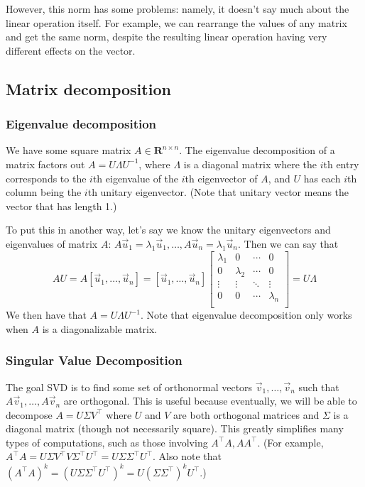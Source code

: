 \documentclass[answers,12pt]{exam}
\begin{document}
However, this norm has some problems: namely, it doesn't say much about the linear operation itself.
For example, we can rearrange the values of any matrix and get the same norm, despite the resulting linear operation having very different effects on the vector.


\subsection{Matrix decomposition}

\subsubsection{Eigenvalue decomposition}
We have some square matrix $A \in \mathbf{R}^{n \times n}$.
The eigenvalue decomposition of a matrix factors out $A = U \Lambda U^{-1}$, where $\Lambda$ is a diagonal matrix where the $i$th entry corresponds to the $i$th eigenvalue of the $i$th eigenvector of $A$, and $U$ has each $i$th column being the $i$th unitary eigenvector.
(Note that unitary vector means the vector that has length 1.)

To put this in another way, let's say we know the unitary eigenvectors and eigenvalues of matrix $A$: $A \vec{u}_1 = \lambda_1 \vec{u}_1, \dots, A \vec{u}_n = \lambda_1 \vec{u}_n$.
Then we can say that 
\[
    AU = A [\vec{u}_1, \dots, \vec{u}_n] = [\vec{u}_1, \dots, \vec{u}_n]
    \begin{bmatrix}
        \lambda_1 & 0 & \cdots & 0 \\
        0 & \lambda_2 & \cdots & 0 \\
        \vdots & \vdots & \ddots & \vdots \\
        0 & 0 & \cdots & \lambda_n \\
    \end{bmatrix}
    = U \Lambda
\]
We then have that $A = U \Lambda U^{-1}$.
Note that eigenvalue decomposition only works when $A$ is a diagonalizable matrix.


\subsubsection{Singular Value Decomposition}
The goal SVD is to find some set of orthonormal vectors $\vec{v}_1, \dots, \vec{v}_n$ such that $A \vec{v}_1, \dots, A \vec{v}_n$ are orthogonal.
This is useful because eventually, we will be able to decompose $A = U \Sigma V^{\top}$ where $U$ and $V$ are both orthogonal matrices and $\Sigma$ is a diagonal matrix (though not necessarily square).
This greatly simplifies many types of computations, such as those involving $A^{\top}A, AA^{\top}$.
(For example, $A^{\top}A = U \Sigma V^{\top} V \Sigma^{\top} U^{\top} = U \Sigma \Sigma^{\top} U^{\top}$.
Also note that ${(A^{\top}A)}^k = {(U \Sigma \Sigma^{\top} U^{\top})}^k = U {(\Sigma \Sigma^{\top})}^k U^{\top}$.)
\end{document}
